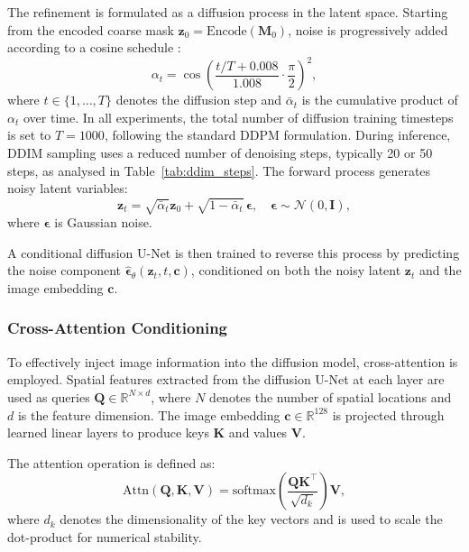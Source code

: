 \documentclass[journal,article,submit,pdftex,moreauthors]{Definitions/mdpi}
\begin{document}
The refinement is formulated as a diffusion process in the latent space. Starting from the encoded coarse mask $\mathbf{z}_0=\mathrm{Encode}(\mathbf{M}_0)$, noise is progressively added according to a cosine schedule \cite{Nichol2021}:
\begin{equation}
\alpha_t=\cos\!\left(\frac{t/T+0.008}{1.008}\cdot\frac{\pi}{2}\right)^2,
\end{equation}
where $t\in\{1,\dots,T\}$ denotes the diffusion step and $\bar{\alpha}_t$ is the cumulative product of $\alpha_t$ over time. In all experiments, the total number of diffusion training timesteps is set to $T=1000$, following the standard DDPM formulation. During inference, DDIM sampling uses a reduced number of denoising steps, typically 20 or 50 steps, as analysed in Table~\ref{tab:ddim_steps}. The forward process generates noisy latent variables:
\begin{equation}
\mathbf{z}_t=\sqrt{\bar{\alpha}_t}\mathbf{z}_0+\sqrt{1-\bar{\alpha}_t}\,\boldsymbol{\epsilon}, 
\quad \boldsymbol{\epsilon}\sim\mathcal{N}(0,\mathbf{I}),
\end{equation}
where $\boldsymbol{\epsilon}$ is Gaussian noise.

A conditional diffusion U-Net is then trained to reverse this process by predicting the noise component $\hat{\boldsymbol{\epsilon}}_\theta(\mathbf{z}_t,t,\mathbf{c})$, conditioned on both the noisy latent $\mathbf{z}_t$ and the image embedding $\mathbf{c}$.


\subsubsection{Cross-Attention Conditioning}

To effectively inject image information into the diffusion model, cross-attention is employed. Spatial features extracted from the diffusion U-Net at each layer are used as queries $\mathbf{Q}\in\mathbb{R}^{N\times d}$, where $N$ denotes the number of spatial locations and $d$ is the feature dimension. The image embedding $\mathbf{c}\in\mathbb{R}^{128}$ is projected through learned linear layers to produce keys $\mathbf{K}$ and values $\mathbf{V}$.

The attention operation is defined as:
\begin{equation}
\mathrm{Attn}(\mathbf{Q},\mathbf{K},\mathbf{V})=
\mathrm{softmax}\!\left(\frac{\mathbf{Q}\mathbf{K}^\top}{\sqrt{d_k}}\right)\mathbf{V},
\end{equation}
where $d_k$ denotes the dimensionality of the key vectors and is used to scale the dot-product for numerical stability.
\end{document}
